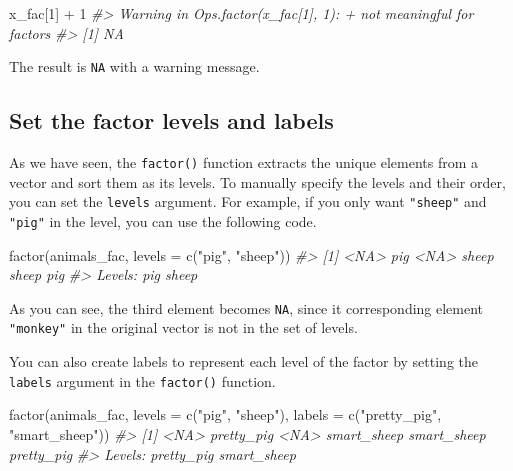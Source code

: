 \documentclass[
]{book}
\newenvironment{Shaded}{\begin{snugshade}}{\end{snugshade}}
\newcommand{\AttributeTok}[1]{\textcolor[rgb]{0.77,0.63,0.00}{#1}}
\newcommand{\CommentTok}[1]{\textcolor[rgb]{0.56,0.35,0.01}{\textit{#1}}}
\newcommand{\DecValTok}[1]{\textcolor[rgb]{0.00,0.00,0.81}{#1}}
\newcommand{\FunctionTok}[1]{\textcolor[rgb]{0.00,0.00,0.00}{#1}}
\newcommand{\NormalTok}[1]{#1}
\newcommand{\SpecialCharTok}[1]{\textcolor[rgb]{0.00,0.00,0.00}{#1}}
\newcommand{\StringTok}[1]{\textcolor[rgb]{0.31,0.60,0.02}{#1}}
\begin{document}
\begin{Shaded}
\begin{Highlighting}[]
\NormalTok{x\_fac[}\DecValTok{1}\NormalTok{] }\SpecialCharTok{+} \DecValTok{1}
\CommentTok{\#\textgreater{} Warning in Ops.factor(x\_fac[1], 1): \textquotesingle{}+\textquotesingle{} not meaningful for factors}
\CommentTok{\#\textgreater{} [1] NA}
\end{Highlighting}
\end{Shaded}

The result is \texttt{NA} with a warning message.

\hypertarget{set-the-factor-levels-and-labels}{%
\subsection{Set the factor levels and labels}\label{set-the-factor-levels-and-labels}}

As we have seen, the \texttt{factor()} function extracts the unique elements from a vector and sort them as its levels. To manually specify the levels and their order, you can set the \texttt{levels} argument. For example, if you only want \texttt{"sheep"} and \texttt{"pig"} in the level, you can use the following code.

\begin{Shaded}
\begin{Highlighting}[]
\FunctionTok{factor}\NormalTok{(animals\_fac, }\AttributeTok{levels =} \FunctionTok{c}\NormalTok{(}\StringTok{"pig"}\NormalTok{, }\StringTok{"sheep"}\NormalTok{))}
\CommentTok{\#\textgreater{} [1] \textless{}NA\textgreater{}  pig   \textless{}NA\textgreater{}  sheep sheep pig  }
\CommentTok{\#\textgreater{} Levels: pig sheep}
\end{Highlighting}
\end{Shaded}

As you can see, the third element becomes \texttt{NA}, since it corresponding element \texttt{"monkey"} in the original vector is not in the set of levels.

You can also create labels to represent each level of the factor by setting the \texttt{labels} argument in the \texttt{factor()} function.

\begin{Shaded}
\begin{Highlighting}[]
\FunctionTok{factor}\NormalTok{(animals\_fac, }\AttributeTok{levels =} \FunctionTok{c}\NormalTok{(}\StringTok{"pig"}\NormalTok{, }\StringTok{"sheep"}\NormalTok{), }\AttributeTok{labels =} \FunctionTok{c}\NormalTok{(}\StringTok{"pretty\_pig"}\NormalTok{, }\StringTok{"smart\_sheep"}\NormalTok{))}
\CommentTok{\#\textgreater{} [1] \textless{}NA\textgreater{}        pretty\_pig  \textless{}NA\textgreater{}        smart\_sheep smart\_sheep pretty\_pig }
\CommentTok{\#\textgreater{} Levels: pretty\_pig smart\_sheep}
\end{Highlighting}
\end{Shaded}
\end{document}

